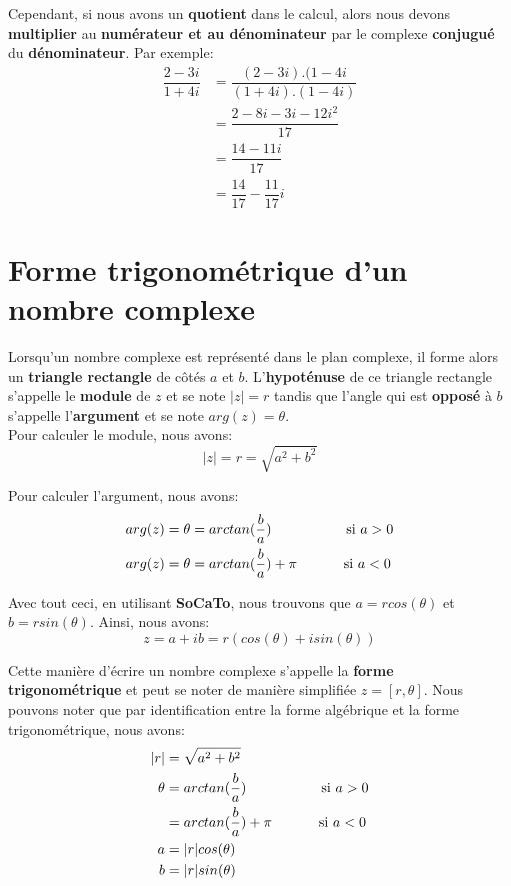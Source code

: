 \documentclass[12pt,a4paper,openany]{book}
\begin{document}
Cependant, si nous avons un \textbf{quotient} dans le calcul, alors nous devons \textbf{multiplier} au \textbf{numérateur et au dénominateur} par le complexe \textbf{conjugué} du \textbf{dénominateur}. Par exemple:
\begin{align*}
\dfrac{2 - 3i}{1 + 4i} & = \dfrac{(2 - 3i).(1 - 4i}{(1 + 4i).(1 - 4i)}\\
					   & = \dfrac{2 - 8i - 3i - 12i^{2}}{17}\\
					   & = \dfrac{14 - 11i}{17}\\
					   & = \dfrac{14}{17} - \dfrac{11}{17}i
\end{align*}

\section{Forme trigonométrique d'un nombre complexe}

Lorsqu'un nombre complexe est représenté dans le plan complexe, il forme alors un \textbf{triangle rectangle} de côtés $ a $ et $ b $. L'\textbf{hypoténuse} de ce triangle rectangle s'appelle le \textbf{module} de $ z $ et se note $ |z| = r $ tandis que l'angle qui est \textbf{opposé} à $ b $ s'appelle l'\textbf{argument} et se note $ arg(z) = \theta $.\\
Pour calculer le module, nous avons:
\begin{equation}
|z| = r = \sqrt{a^{2} + b^{2}}
\end{equation}

Pour calculer l'argument, nous avons:
\begin{align}
arg(z) & = \theta = arctan(\dfrac{b}{a}) \text{\hspace{50px} si $ a > 0 $}\\
arg(z) & = \theta = arctan(\dfrac{b}{a}) + \pi \text{\hspace{30px} si $ a < 0 $}
\end{align}

Avec tout ceci, en utilisant \textbf{SoCaTo}, nous trouvons que $ a = rcos(\theta) $ et $ b = rsin(\theta) $. Ainsi, nous avons:
\begin{equation}
z = a + ib = r(cos(\theta) + isin(\theta))
\end{equation}

Cette manière d'écrire un nombre complexe s'appelle la \textbf{forme trigonométrique} et peut se noter de manière simplifiée $ z = [r, \theta] $. Nous pouvons noter que par identification entre la forme algébrique et la forme trigonométrique, nous avons:
\begin{align*}
|r| & = \sqrt{a^{2} + b^{2}}\\
\theta & = arctan(\dfrac{b}{a}) \text{\hspace{50px} si $ a > 0 $}\\
	   & = arctan(\dfrac{b}{a}) + \pi \text{\hspace{30px} si $ a < 0 $}\\
a & = |r|cos(\theta)\\
b & = |r|sin(\theta)
\end{align*}
\end{document}
